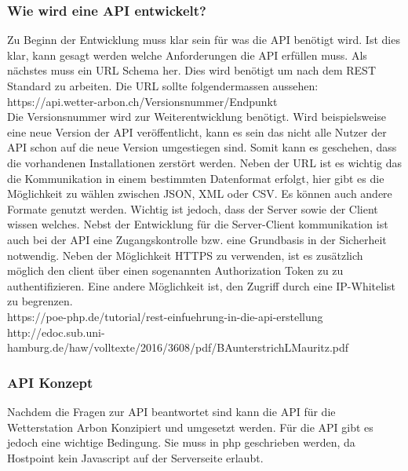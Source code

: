 \subsubsection{Wie wird eine API entwickelt?}
Zu Beginn der Entwicklung muss klar sein für was die API benötigt wird. Ist dies klar, kann gesagt werden welche Anforderungen die API erfüllen muss. Als nächstes muss ein URL Schema her. Dies wird benötigt um nach dem REST Standard zu arbeiten. Die URL sollte folgendermassen aussehen: \\ https://api.wetter-arbon.ch/Versionsnummer/Endpunkt\\
Die Versionsnummer wird zur Weiterentwicklung benötigt. Wird beispielsweise eine neue Version der API veröffentlicht, kann es sein das nicht alle Nutzer der API schon auf die neue Version umgestiegen sind. Somit kann es geschehen, dass die vorhandenen Installationen zerstört werden. Neben der URL ist es wichtig das die Kommunikation in einem bestimmten Datenformat erfolgt, hier gibt es die Möglichkeit zu wählen zwischen JSON, XML oder CSV. Es können auch andere Formate genutzt werden. Wichtig ist jedoch, dass der Server sowie der Client wissen welches. Nebst der Entwicklung für die Server-Client kommunikation ist auch bei der API eine Zugangskontrolle bzw. eine Grundbasis in der Sicherheit notwendig. Neben der Möglichkeit HTTPS zu verwenden, ist es zusätzlich möglich den client über einen sogenannten Authorization Token zu zu authentifizieren. Eine andere Möglichkeit ist, den Zugriff durch eine IP-Whitelist zu begrenzen. \\

https://poe-php.de/tutorial/rest-einfuehrung-in-die-api-erstellung\\
http://edoc.sub.uni-hamburg.de/haw/volltexte/2016/3608/pdf/BAunterstrichLMauritz.pdf\\

\subsubsection{API Konzept}
Nachdem die Fragen zur API beantwortet sind kann die API für die Wetterstation Arbon Konzipiert und umgesetzt werden. Für die API gibt es jedoch eine wichtige Bedingung. Sie muss in php geschrieben werden, da Hostpoint kein Javascript auf der Serverseite erlaubt. 

